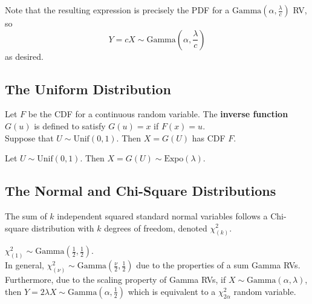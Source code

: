\begin{enumerate}[a)]
    Note that the resulting expression is precisely the PDF for a $\mathrm{Gamma}\left( \alpha, \frac{\lambda}{c} \right)$ RV, so 
    \[
        Y = cX \sim \mathrm{Gamma}\left( \alpha, \frac{\lambda}{c} \right)        
    \] 
    as desired. 

    \subsection{The Uniform Distribution}

    \begin{definition}
    Let $F$ be the CDF for a continuous random variable. The \textbf{inverse function} $G(u)$ is defined
    to satisfy $G(u) = x$ if $F(x) = u$. \\

    Suppose that $U \sim \mathrm{Unif}(0, 1)$. Then  $X = G(U)$ has CDF $F$.
    \end{definition}

    \begin{remark}
    Let $U \sim \mathrm{Unif}(0, 1)$. Then  $X = G(U) \sim \mathrm{Expo}(\lambda)$. 
    \end{remark}

    \subsection{The Normal and Chi-Square Distributions}

    \begin{definition}
    The sum of $k$ independent squared standard normal variables follows a Chi-square distribution with $k$ degrees of freedom, denoted $\chi^2_(k)$. 
    \end{definition}

    \begin{remark}
    $\chi ^2_(1) \sim \mathrm{Gamma}\left( \frac{1}{2}, \frac{1}{2} \right)$. \\
    
    In general, $\chi ^2_(\nu) \sim \mathrm{Gamma}\left( \frac{\nu}{2}, \frac{1}{2} \right)$  due to the properties of a sum Gamma RVs. \\

    Furthermore, due to the scaling property of Gamma RVs, if $X \sim \mathrm{Gamma}(\alpha, \lambda)$, then $Y = 2\lambda X \sim \mathrm{Gamma}\left( \alpha, \frac{1}{2} \right)$
    which is equivalent to a $\chi ^2_{2\alpha}$ random variable.  
    \end{remark}


\end{enumerate}
